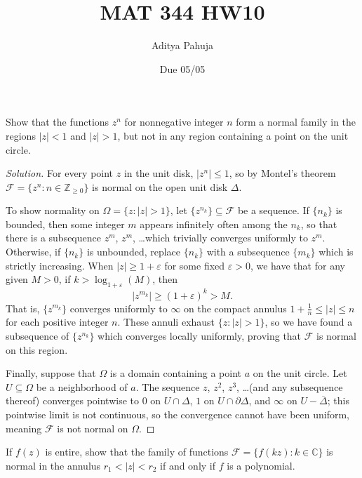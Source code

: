 \documentclass[10pt]{article}
\title{MAT 344 HW10}
\author{\large Aditya Pahuja}
\date{\large Due 05/05}
\providecommand{\ol}{\overline}
\providecommand{\eps}{\varepsilon}
\providecommand{\CC}{\mathbb C}
\providecommand{\ZZ}{\mathbb Z}
\newenvironment{soln}{\begin{proof}[Solution]}{\end{proof}}
\providecommand{\abs}[1]{\left\lvert #1\right\rvert}
\begin{document}
\maketitle

\begin{problem}
    [p.227\#2]
    Show that the functions $z^n$ for nonnegative integer $n$
    form a normal family in the regions $\abs z < 1$
    and $\abs z > 1$, but not in any region containing
    a point on the unit circle.
\end{problem}

\begin{soln}
    For every point $z$ in the unit disk,
    $\abs{z^n} \le 1$, so by Montel's theorem
    $\mathcal F = \{z^n : n\in\ZZ_{\ge 0}\}$ is normal
    on the open unit disk $\Delta$.

    To show normality on $\Omega = \{z : \abs z > 1\}$,
    let $\{z^{n_k}\}\subseteq\mathcal F$ be a sequence.
    If $\{n_k\}$ is bounded, then some integer $m$ appears infinitely often
    among the $n_k$, so that there is a subsequence
    $z^m$, $z^m$, \dots which trivially converges uniformly to $z^m$.
    Otherwise, if $\{n_k\}$ is unbounded,
    replace $\{n_k\}$ with a subsequence $\{m_k\}$
    which is strictly increasing.
    When $\abs z \ge 1 + \eps$ for some fixed $\eps > 0$,
    we have that for any given $M > 0$,
    if $k > \log_{1+\eps}(M)$, then
    \begin{equation*}
        \abs{z^{m_k}} \ge (1 + \eps)^k > M.
    \end{equation*}
    That is, $\{z^{m_k}\}$ converges uniformly to $\infty$
    on the compact annulus $1 + \frac 1n \le \abs z \le n$
    for each positive integer $n$.
    These annuli exhaust $\{z : \abs z > 1\}$, so we have found
    a subsequence of $\{z^{n_k}\}$ which converges locally uniformly,
    proving that $\mathcal F$ is normal on this region.

    Finally, suppose that $\Omega$ is a domain containing
    a point $a$ on the unit circle.
    Let $U\subseteq\Omega$ be a neighborhood of $a$.
    The sequence $z$, $z^2$, $z^3$, \dots (and any subsequence thereof)
    converges pointwise to $0$ on $U\cap\Delta$,
    $1$ on $U\cap\partial\Delta$, and $\infty$
    on $U - \ol\Delta$; this pointwise limit is not continuous,
    so the convergence cannot have been uniform,
    meaning $\mathcal F$ is not normal on $\Omega$.
\end{soln}

\begin{problem}
    [p.227\#3]
    If $f(z)$ is entire, show that the family of functions
    $\mathcal F = \{f(kz) : k\in\CC\}$ is normal in the annulus
    $r_1 < \abs z < r_2$ if and only if $f$ is a polynomial.
\end{problem}
\end{document}
